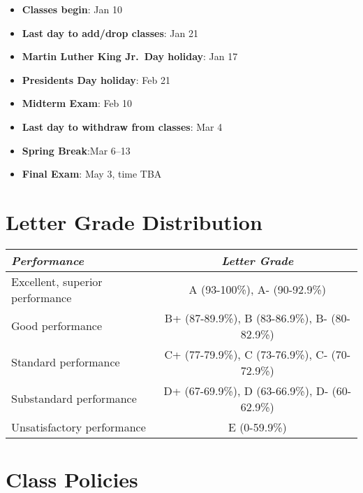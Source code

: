 \documentclass[11pt,]{article}
\providecommand{\tightlist}{%
  \setlength{\itemsep}{0pt}\setlength{\parskip}{0pt}}
\begin{document}
\vspace{.3cm}

\begin{itemize}
\tightlist
\item
  \textbf{Classes begin}: Jan 10
\item
  \textbf{Last day to add/drop classes}: Jan 21
\item
  \textbf{Martin Luther King Jr.~Day holiday}: Jan 17
\item
  \textbf{Presidents Day holiday}: Feb 21
\item
  \textbf{Midterm Exam}: Feb 10
\item
  \textbf{Last day to withdraw from classes}: Mar 4
\item
  \textbf{Spring Break}:Mar 6--13
\item
  \textbf{Final Exam}: May 3, time TBA
\end{itemize}

\hypertarget{letter-grade-distribution}{%
\section{Letter Grade Distribution}\label{letter-grade-distribution}}

\vspace{.2cm}

\begin{longtable}[]{@{}lc@{}}
\toprule
\textbf{\emph{Performance}} & \textbf{\emph{Letter Grade}} \\
\midrule
\endhead
Excellent, superior performance & A (93-100\%), A- (90-92.9\%) \\
Good performance & B+ (87-89.9\%), B (83-86.9\%), B- (80-82.9\%) \\
Standard performance & C+ (77-79.9\%), C (73-76.9\%), C- (70-72.9\%) \\
Substandard performance & D+ (67-69.9\%), D (63-66.9\%), D-
(60-62.9\%) \\
Unsatisfactory performance & E (0-59.9\%) \\
\bottomrule
\end{longtable}

\vspace{.5cm}

\hypertarget{class-policies}{%
\section{Class Policies}\label{class-policies}}

\vspace{.3cm}
\end{document}
